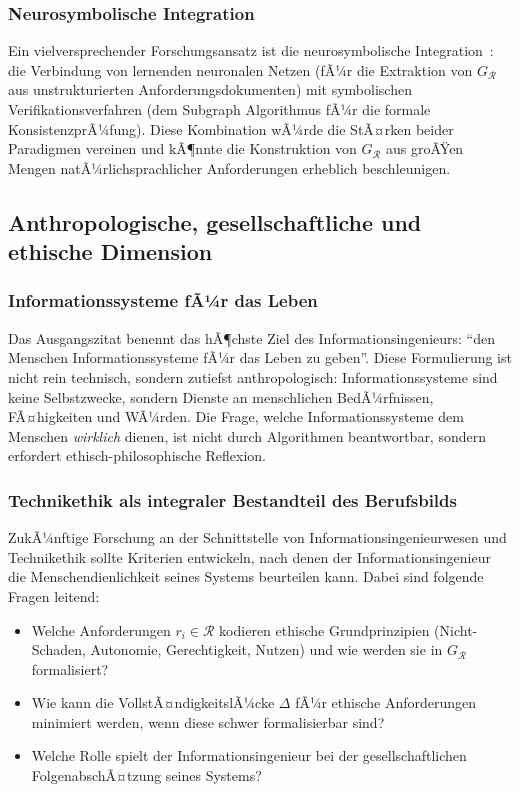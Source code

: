 ﻿\documentclass[a4paper,12pt]{article}
\theoremstyle{definition}
\begin{document}
\subsubsection{Neurosymbolische Integration}

Ein vielversprechender Forschungsansatz ist die neurosymbolische Integration~\cite{lamb2020}:
die Verbindung von lernenden neuronalen Netzen (fÃ¼r die Extraktion von $G_\mathcal{R}$
aus unstrukturierten Anforderungsdokumenten) mit symbolischen Verifikationsverfahren
(dem Subgraph Algorithmus fÃ¼r die formale KonsistenzprÃ¼fung). Diese Kombination
wÃ¼rde die StÃ¤rken beider Paradigmen vereinen und kÃ¶nnte die Konstruktion von
$G_\mathcal{R}$ aus groÃŸen Mengen natÃ¼rlichsprachlicher Anforderungen erheblich
beschleunigen.

\subsection{Anthropologische, gesellschaftliche und ethische Dimension}

\subsubsection{Informationssysteme fÃ¼r das Leben}

Das Ausgangszitat benennt das hÃ¶chste Ziel des Informationsingenieurs:
\enquote{den Menschen Informationssysteme fÃ¼r das Leben zu geben}. Diese Formulierung
ist nicht rein technisch, sondern zutiefst anthropologisch: Informationssysteme
sind keine Selbstzwecke, sondern Dienste an menschlichen BedÃ¼rfnissen, FÃ¤higkeiten
und WÃ¼rden. Die Frage, welche Informationssysteme dem Menschen \emph{wirklich} dienen,
ist nicht durch Algorithmen beantwortbar, sondern erfordert ethisch-philosophische
Reflexion.

\subsubsection{Technikethik als integraler Bestandteil des Berufsbilds}

ZukÃ¼nftige Forschung an der Schnittstelle von Informationsingenieurwesen und Technikethik
sollte Kriterien entwickeln, nach denen der Informationsingenieur die Menschendienlichkeit
seines Systems beurteilen kann. Dabei sind folgende Fragen leitend:
\begin{itemize}
  \item Welche Anforderungen $r_i \in \mathcal{R}$ kodieren ethische Grundprinzipien
        (Nicht-Schaden, Autonomie, Gerechtigkeit, Nutzen) und wie werden sie in
        $G_\mathcal{R}$ formalisiert?
  \item Wie kann die VollstÃ¤ndigkeitslÃ¼cke $\Delta$ fÃ¼r ethische Anforderungen
        minimiert werden, wenn diese schwer formalisierbar sind?
  \item Welche Rolle spielt der Informationsingenieur bei der gesellschaftlichen
        FolgenabschÃ¤tzung seines Systems?
\end{itemize}
\end{document}
